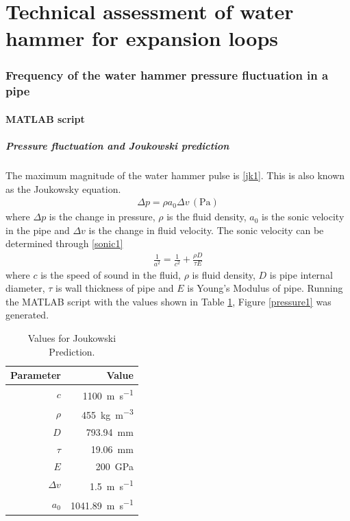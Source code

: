 \part{Technical assessment of water hammer for expansion loops}
\section{Frequency of the water hammer pressure fluctuation in a pipe}
\subsection{MATLAB script}
\subsubsection{Pressure fluctuation and Joukowski prediction}
The maximum magnitude of the water hammer pulse is \eqref{jk1}. This is also known as the Joukowsky equation.
\begin{gather}\label{jk1}
    \Delta p = \rho a_0 \Delta v\, (\si{\pascal})
\end{gather}
where $\Delta p$ is the change in pressure, $\rho$ is the fluid density, $a_0$ is the sonic velocity in the pipe and $\Delta v$ is the change in fluid velocity. The sonic velocity can be determined through \eqref{sonic1}
\begin{gather}\label{sonic1}
    \frac{1}{a^2} = \frac{1}{c^2} + \frac{\rho D }{\tau E}
\end{gather}
where $c$ is the speed of sound in the fluid, $\rho$ is fluid density, $D$ is pipe internal diameter, $\tau$ is wall thickness of pipe and $E$ is Young's Modulus of pipe. Running the MATLAB script with the values shown in Table \ref{matlabScriptVals}, Figure \ref{pressure1} was generated.
\begin{table}[H]
    \centering
    \begin{tabular}{@{}rr@{}}
        \toprule
        \textbf{Parameter} & \textbf{Value}\\
        \midrule
        $c$ & \SI{1100}{\meter\per\second}\\
        $\rho$ & \SI{455}{\kilo\gram\per\meter\cubed}\\
        $D$ & \SI{793.94}{\milli\meter}\\
        $\tau$ & \SI{19.06}{\milli\meter}\\
        $E$ & \SI{200}{\giga\pascal}\\
        $\Delta v$ & \SI{1.5}{\meter\per\second}\\
        $a_0$ & \SI{1041.89}{\meter\per\second}\\
        \bottomrule
    \end{tabular}
    \caption{Values for Joukowski Prediction.}
    \label{matlabScriptVals}
\end{table}
